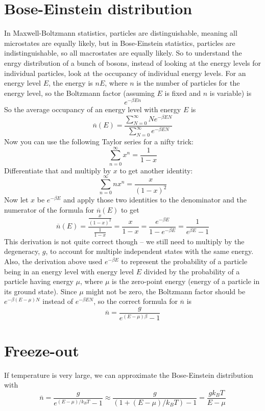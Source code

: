 \documentclass[12pt]{article}
\begin{document}
\section{Bose-Einstein distribution}
In Maxwell-Boltzmann statistics, particles are distinguishable, meaning all microstates are equally likely, but in Bose-Einstein statistics, particles are indistinguishable, so all macrostates are equally likely. So to understand the enrgy distribution of a bunch of bosons, instead of looking at the energy levels for individual particles, look at the occupancy of individual energy levels. For an energy level $E$, the energy is $nE$, where $n$ is the number of particles for the energy level, so the Boltzmann factor (assuming $E$ is fixed and $n$ is variable) is
\[e^{- \beta E n}\]
So the average occupancy of an energy level with energy $E$ is
\[\overline{n}(E) = \frac{\sum\limits_{N=0}^\infty N e^{- \beta E N}}{\sum\limits_{N=0}^\infty e^{- \beta E N}}\]
Now you can use the following Taylor series for a nifty trick:
\[\sum_{n=0}^\infty x^n = \frac{1}{1 - x} \]
Differentiate that and multiply by $x$ to get another identity:
\[\sum_{n=0}^\infty nx^n = \frac{x}{(1-x)^2} \]
Now let $x$ be $e^{-\beta E}$ and apply those two identities to the denominator and the numerator of the formula for $\overline{n}(E)$ to get
\[\overline{n}(E) = \frac{ \frac{x}{(1-x)^2} }{ \frac{1}{1-x} } = \frac{x}{1 - x} = \frac{e^{-\beta E}}{1 - e^{-\beta E}} = \frac{1}{e^{\beta E} - 1} \]
This derivation is not quite correct though -- we still need to multiply by the degeneracy, $g$, to account for multiple independent states with the same energy. Also, the derivation above used $e^{-\beta E}$ to represent the probability of a particle being in an energy level with energy level $E$ divided by the probability of a particle having energy $\mu$, where $\mu$ is the zero-point energy (energy of a particle in its ground state). Since $\mu$ might not be zero, the Boltzmann factor should be $e^{-\beta (E - \mu) N}$ instead of $e^{-\beta E N}$, so the correct formula for $\overline{n}$ is
\[\overline{n} = \frac{g}{e^{(E - \mu) \beta} - 1} \]

\section{Freeze-out}
If temperature is very large, we can approximate the Bose-Einstein distribution with
\[\overline{n} = \frac{g}{e^{(E - \mu) / k_B T} - 1} \approx \frac{g}{(1 + (E - \mu) / k_B T) - 1} = \frac{g k_B T}{E - \mu}\]
\end{document}
